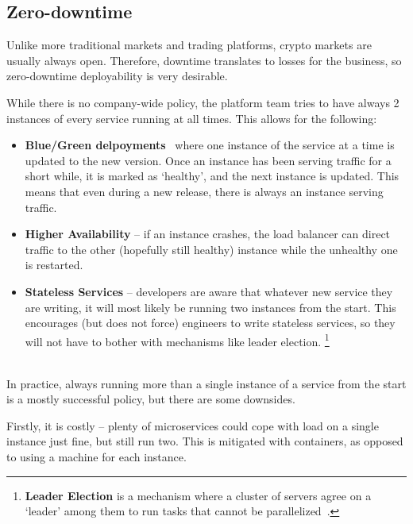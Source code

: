 \documentclass[conference]{IEEEtran}
\begin{document}
    \subsection{Zero-downtime}

    Unlike more traditional markets and trading platforms, crypto markets are usually always open.
    Therefore, downtime translates to losses for the business, so zero-downtime deployability is
    very desirable.

    While there is no company-wide policy, the platform team tries to have always 2 instances
    of every service running at all times.
    This allows for the following:

    \begin{itemize}
        \newcommand{\entry}[1]{\item[] \hspace{-1em}\textbf{#1}}
        \entry{Blue/Green delpoyments}~\cite{nomadBlueGreen} where one instance of the
        service at a time is updated to the new version.
        Once an instance has been serving traffic for a short while, it is marked as `healthy', and
        the next instance is updated.
        This means that even during a new release, there is always an instance serving traffic.
        \entry{Higher Availability} -- if an instance crashes, the load balancer can direct traffic
        to the other (hopefully still healthy) instance while the unhealthy one is restarted.
        \entry{Stateless Services} -- developers are aware that whatever new service they are
        writing, it will most likely be running two instances from the start.
        This encourages (but does not force) engineers to write stateless services, so they will not
        have to bother with mechanisms like leader election.
        \footnote{\textbf{Leader Election} is a mechanism where a cluster of servers agree on a
        `leader' among them to run tasks that cannot be parallelized~\cite{attiya2004distributed}.}
    \end{itemize}\\

    In practice, always running more than a single instance of a service from the start is a mostly
    successful policy, but there are some downsides.

    Firstly, it is costly -- plenty of microservices could cope with load on a single instance just
    fine, but still run two.
    This is mitigated with containers, as opposed to using a machine for each
    instance.
\end{document}
